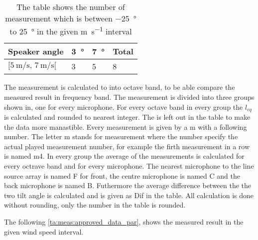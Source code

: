 
\begin{table}[H]
\centering
\caption{The table shows the number of measurement which is between \SI{-25}{\degree} to \SI{25}{\degree} in the given \si{\meter\per\second} interval}
\begin{tabular}{l|l|l|l}
Speaker angle & \SI{3}{\degree}  & \SI{7}{\degree} & Total \\ \hline
$[\SI{5}{\meter\per\second},\, \SI{7}{\meter\per\second}[  $        & 3  & 5  & 8     \\      
\end{tabular}
\label{ta:meas:approved_measurement_par}
\end{table}

The measurement is calculated to into octave band, to be able compare the measured result in frequency band. The measurement is divided into three groups shown in, one for every microphone. For every octave band in every group the $l_{eq}$ is calculated and rounded to nearest integer. The \db is left out in the table to make the data more manastible. Every measurement is given by a m with a following number. The letter m stands for measurement where the number specify the actual played measurement number, for example the firth measurement in a row is named m4. In every group the average of the measurements is calculated for every octrave band and for every microphone. The nearest microphone to the line source array is named F for front, the centre microphone is named C and the back microphone is named B. Futhermore the average difference between the the two tilt angle is calculated and is given as Dif in the table. All calculation is done without rounding, only the number in the table is rounded.

 The following \autoref{ta:meas:approved_data_par}, shows the measured result in the given wind speed interval.

